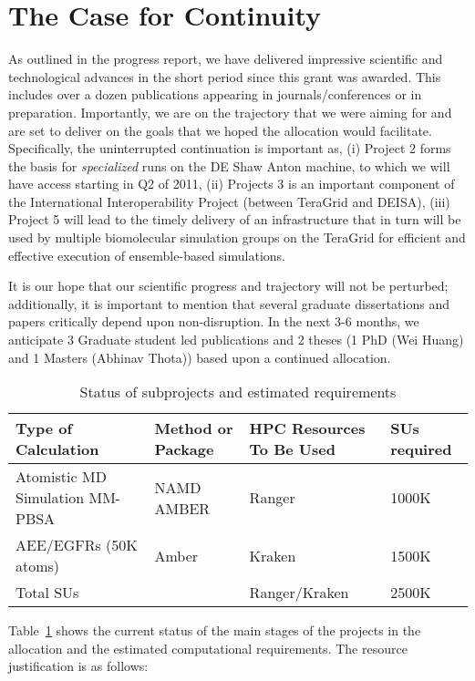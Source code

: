 \documentclass[a4paper,10pt]{article}
\begin{document}
\section{The Case for Continuity}

As outlined in the progress report, we have delivered impressive scientific and technological advances in the short period since this grant was awarded. This includes over a dozen publications appearing in journals/conferences or in preparation. Importantly, we are on the trajectory that we were aiming for and are set to deliver on the goals that we hoped the allocation would facilitate.  Specifically, the uninterrupted continuation is important as, (i) Project 2 forms the basis for {\it specialized} runs on the DE Shaw Anton machine, to which we will have access starting in Q2 of 2011, (ii) Projects 3 is an important component of the International Interoperability Project (between TeraGrid and DEISA), (iii) Project 5 will lead to the timely delivery of an infrastructure that in turn will be used by multiple biomolecular simulation groups on the TeraGrid for efficient and effective execution of ensemble-based simulations.

It is our hope that our scientific progress and trajectory will not be perturbed; additionally, it is important to mention that several graduate dissertations and papers critically depend upon non-disruption. In the next 3-6 months, we anticipate 3 Graduate student led publications and 2 theses (1 PhD (Wei Huang) and 1 Masters (Abhinav Thota)) based upon a continued allocation.

\begin{table}
\caption{Status of subprojects and estimated requirements}
\label{table:tab1}
\begin{tabular}{ |  p{5cm} | l | l | l |}
\hline
Type of Calculation & Method or Package & HPC Resources To Be Used & SUs required\\ \hline \hline
Atomistic MD Simulation MM-PBSA & NAMD AMBER & Ranger & 1000K\\ \hline
AEE/EGFRs (50K atoms) & Amber & Kraken & 1500K\\ \hline
Total SUs  &   & Ranger/Kraken & 2500K \\ \hline
\end{tabular}

\end{table}

Table~\ref{table:tab1} shows the current status of the main stages of the projects in the allocation and the estimated computational requirements. The resource justification is as follows:
\end{document}
